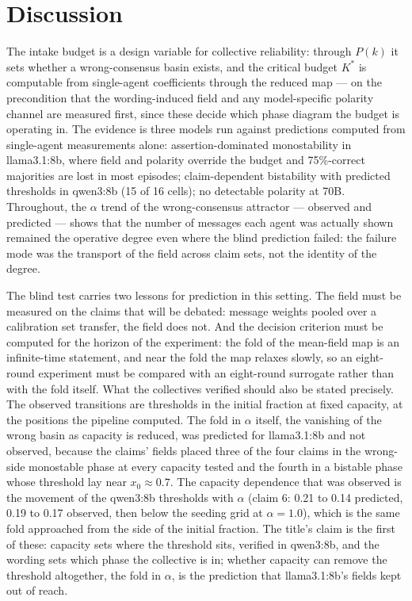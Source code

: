 \documentclass[11pt]{article}
\begin{document}
\section{Discussion}\label{sec:discussion}

The intake budget is a design variable for collective reliability: through
$P(k)$ it sets whether a wrong-consensus basin exists, and the critical
budget $K^*$ is computable from single-agent coefficients through the reduced map ---
on the precondition that the wording-induced field and any model-specific
polarity channel are measured first, since these decide which phase diagram
the budget is operating in. The evidence is three models run against
predictions computed from single-agent measurements alone:
assertion-dominated monostability in llama3.1:8b, where field and polarity
override the budget and 75\%-correct majorities are lost in most episodes; claim-dependent
bistability with predicted thresholds in qwen3:8b (15 of 16 cells); no
detectable polarity at 70B. Throughout,
the $\alpha$ trend of the wrong-consensus attractor --- observed and
predicted --- shows that the number of messages each agent was actually shown
remained the operative degree even where the blind prediction failed: the
failure mode was the transport of the field across claim sets, not the
identity of the degree.

The blind test carries two lessons for prediction in this setting. The field
must be measured on the claims that will be debated: message weights pooled
over a calibration set transfer, the field does not. And the decision
criterion must be computed for the horizon of the experiment: the fold of the
mean-field map is an infinite-time statement, and near the fold the map
relaxes slowly, so an eight-round experiment must be compared with an
eight-round surrogate rather than with the fold itself. What the collectives
verified should also be stated precisely. The observed transitions are
thresholds in the initial fraction at fixed capacity, at the positions the
pipeline computed. The fold in $\alpha$ itself, the vanishing of the wrong
basin as capacity is reduced, was predicted for llama3.1:8b and not observed,
because the claims' fields placed three of the four claims in the
wrong-side monostable phase at every capacity tested and the fourth in a
bistable phase whose threshold lay near $x_0 \approx 0.7$. The capacity
dependence that was observed is
the movement of the qwen3:8b thresholds with $\alpha$ (claim 6: 0.21 to 0.14
predicted, 0.19 to 0.17 observed, then below the seeding grid at
$\alpha = 1.0$), which is the same fold approached from the side of the
initial fraction. The title's claim is the first of these: capacity sets
where the threshold sits, verified in qwen3:8b, and the wording sets which
phase the collective is in; whether capacity can remove the threshold
altogether, the fold in $\alpha$, is the prediction that llama3.1:8b's fields
kept out of reach.
\end{document}
